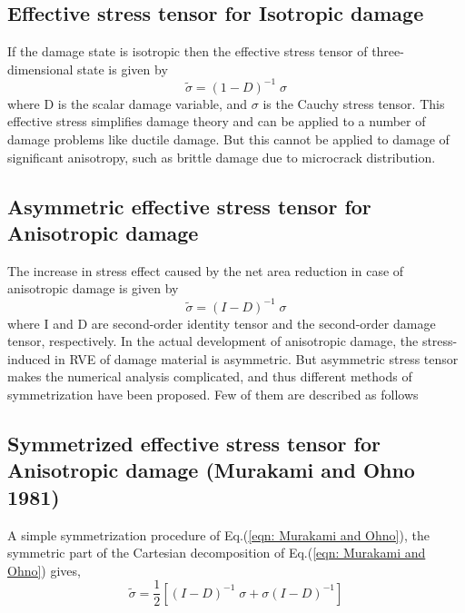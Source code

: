 \documentclass[a4paper,12pt,twoside]{report}
\begin{document}
\subsection{Effective stress tensor for Isotropic damage}
\indent\indent\indent If the damage state is isotropic then the effective stress tensor of three-dimensional state is given by
\begin{equation}
\tilde{\sigma} = (1 - D)^{-1} \; \sigma
\end{equation}
where D is the scalar damage variable, and $\sigma$ is the Cauchy stress tensor. This effective stress simplifies damage theory and can be applied to a number of damage problems like ductile damage. But this cannot be applied to damage of significant anisotropy, such as brittle damage due to microcrack distribution.\\
\subsection{Asymmetric effective stress tensor for Anisotropic damage}
\indent\indent\indent The increase in stress effect caused by the net area reduction in case of anisotropic damage is given by
\begin{equation}
\tilde{\sigma} = (I - D)^{-1} \; \sigma
\end{equation}
where I and D are second-order identity tensor and the second-order damage tensor, respectively. In the actual development of anisotropic damage, the stress-induced in RVE of damage material is asymmetric. But asymmetric stress tensor makes the numerical analysis complicated, and thus different methods of symmetrization have been proposed. Few of them are described as follows

\subsection{Symmetrized effective stress tensor for Anisotropic damage (Murakami and Ohno 1981)} 
\indent\indent\indent A simple symmetrization procedure of Eq.(\ref{eqn: Murakami and Ohno}), the symmetric part of the Cartesian decomposition of Eq.(\ref{eqn: Murakami and Ohno}) gives,
\begin{equation}
\label{eqn: Murakami and Ohno}
\tilde{\sigma} = \frac{1}{2} [(I - D)^{-1}\;\sigma + \sigma(I - D)^{-1}]
\end{equation}\\
\end{document}
